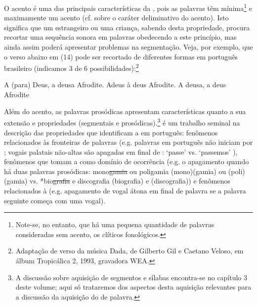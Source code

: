 \documentclass[output=paper]{LSP/langsci}
\begin{document}
O acento é uma das principais características da , pois as palavras têm mínima\footnote{Note-se, no entanto, que há uma pequena quantidade de palavras consideradas sem acento, os clíticos fonológicos.} e maximamente um acento (cf. \citealt{jakobson1941} sobre o caráter deliminativo do acento). Isto significa que um estrangeiro ou uma criança, sabendo desta propriedade, procura recortar uma sequência sonora em palavras obedecendo a este princípio, mas ainda assim poderá apresentar problemas na segmentação. Veja, por exemplo, que o verso abaixo em (14) pode ser recortado de diferentes formas em português brasileiro (indicamos 3 de 6 possibilidades):\footnote{Adaptação de verso da música Dada, de Gilberto Gil e Caetano Veloso, em álbum Tropicálica 2, 1993, gravadora WEA.}

\ea\label{ex:santana_14}
\ea\label{ex:santana_14a}
A (para) Deus, a deusa Afrodite.
\ex\label{ex:santana_14b}
Adeus à deus Afrodite.
\ex\label{ex:santana_14c}
A deusa, a deus Afrodite
\zl

Além do acento, as palavras prosódicas apresentam características quanto a sua extensão e propriedades (segmentais e prosódicas).\footnote{A discussão sobre aquisição de segmentos e sílabas encontra-se no capítulo 3 deste volume; aqui só trataremos dos aspectos desta aquisição relevantes para a discussão da aquisição do  de palavra.} \citet{vigario2003} é um trabalho seminal na descrição das propriedades que identificam a  em português: fenômenos relacionados às fronteiras de palavras (e.g. palavras em português não iniciam por \ipa{[\textltailn,R,L]}; vogais palatais não-altas são apagadas em final de : `passe'  vs. `passemos' ), fenômenos que tomam a  como domínio de ocorrência (e.g. o apagamento quando há duas palavras prosódicas: mono\sout{gamia} ou poligamia (mono)(gamia) ou (poli)(gamia) vs. *bio\sout{grafia} e discografia (biografia) e (discografia)) e fenômenos relacionados à  (e.g. apagamento de vogal átona em final de palavra se a palavra seguinte começa com uma vogal). 
\end{document}
